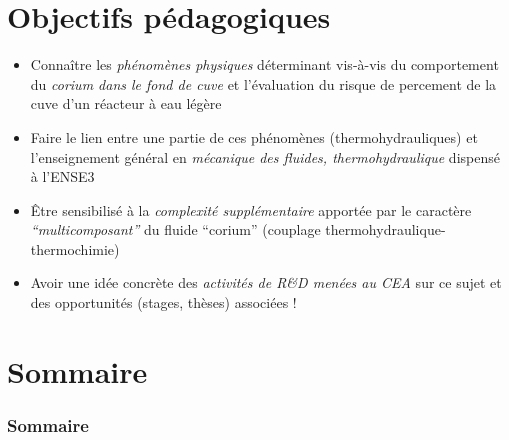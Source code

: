 \documentclass[usenames,dvipsnames]{beamer}
\renewcommand{\emph}[1]{\textcolor{cea8}{\textit{#1}}}
\begin{document}
\PageTitre{}

\section{Objectifs pédagogiques}
\begin{frame}[fragile]
\begin{itemize}
\item Connaître les \emph{phénomènes physiques} déterminant vis-à-vis du comportement du \emph{corium dans le fond de cuve} et l'évaluation du risque de percement de la cuve d'un réacteur à eau légère
\item Faire le lien entre une partie de ces phénomènes (thermohydrauliques) et l'enseignement général en \emph{mécanique des fluides, thermohydraulique} dispensé à l'ENSE3
\item Être sensibilisé à la \emph{complexité supplémentaire} apportée par le caractère \emph{``multicomposant''} du fluide ``corium'' (couplage thermohydraulique-thermochimie)
\item Avoir une idée concrète des \emph{activités de R\&D menées au CEA} sur ce sujet et des opportunités (stages, thèses) associées !
\end{itemize}
\end{frame}

\section*{Sommaire}
\begin{frame}[fragile]
\frametitle{Sommaire}
  \linespread{0.9}
  \tableofcontents[sectionstyle=hide/show, subsectionstyle=hide/show/show,sections={2-}, firstsection=2]
  \linespread{1}
\end{frame}



\end{document}
